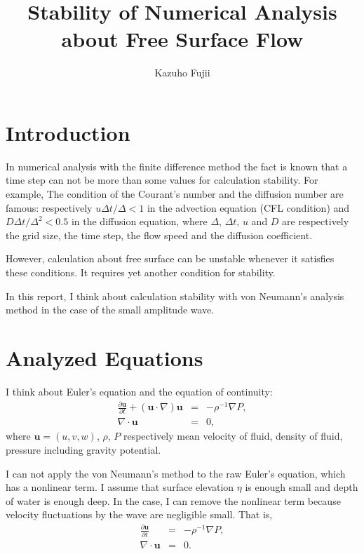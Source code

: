 \documentclass[a4paper,11pt]{article}
\title{Stability of Numerical Analysis about Free Surface Flow}
\author{Kazuho Fujii}
\date{}
\begin{document}
\maketitle

\section{Introduction}
In numerical analysis with the finite difference method the fact is known
that a time step can not be more than some values for calculation
stability. For example, The condition of the Courant's number and the
diffusion number are famous: respectively $u\Delta t/\Delta < 1$ in
the advection equation (CFL condition) and $D\Delta t/\Delta^2 <
0.5$ in the diffusion equation, where $\Delta$, $\Delta t$, $u$ and $D$
are respectively the grid size, the time step, the flow speed and the
diffusion coefficient.

However, calculation about free surface can be unstable whenever it satisfies these conditions. It requires yet another condition for stability.

In this report, I think about calculation stability with von Neumann's analysis method in the case of the small amplitude wave.

\section{Analyzed Equations}

I think about Euler's equation and the equation of continuity:
\begin{eqnarray}
\frac{\partial \bm{u}}{\partial t}
 + (\bm{u} \cdot \nabla)\bm{u}
&=& - \rho^{-1}\nabla P, \\
\nabla \cdot \bm{u} &=& 0,
\end{eqnarray}
where $\bm{u}=(u,v,w)$, $\rho$, $P$ respectively mean velocity of fluid, density of fluid, pressure including gravity potential.

I can not apply the von Neumann’s method to the raw Euler’s equation,
which has a nonlinear term. I assume that surface elevation $\eta$ is
enough small and depth of water is enough deep. In the case, I can
remove the nonlinear term because velocity fluctuations by the wave are
negligible small. That is,
\begin{eqnarray}
\frac{\partial \bm{u}}{\partial t}
&=& - \rho^{-1}\nabla P, \label{linear-euler}\\
\nabla \cdot \bm{u} &=& 0.
\end{eqnarray}
\end{document}
